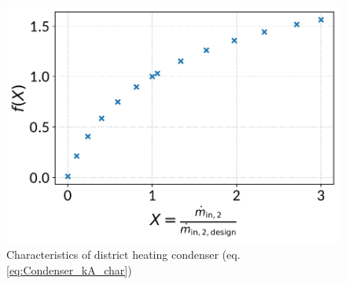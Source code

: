 \documentclass[]{article}
\begin{document}
\begin{minipage}{0.5\textwidth}
\begin{figure}[H]\begin{center}
\includegraphics[width=\textwidth]{figures/Condenser_CharLine_kA_char2_district_heating_condenser.pdf}
\caption{Characteristics of district heating condenser (eq. \ref{eq:Condenser_kA_char})}
\label{fig:CharLine_kA_char2_district heating condenser}
\end{center}\end{figure}

\end{minipage}
\end{document}

